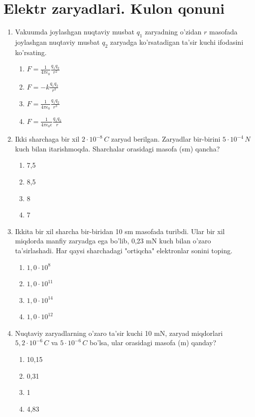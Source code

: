 \section{Elektr zaryadlari. Kulon qonuni}



\begin{enumerate}

\item Vakuumda joylashgan nuqtaviy musbat $q_1$ zaryadning o'zidan $r$ masofada joylashgan nuqtaviy musbat $q_2$ zaryadga ko'rsatadigan ta'sir kuchi ifodasini ko'rsating.
\begin{enumerate}[label=\Alph*)]
\item $F = \frac{1}{4\pi\epsilon_0} \frac{q_1 q_2}{r^2}$
\item $F = -k \frac{q_1 q_2}{r^3}$
\item $F = \frac{1}{4\pi\epsilon_0} \frac{q_1 q_2}{r^3}$
\item $F = \frac{1}{4\pi\epsilon_0 \epsilon} \frac{q_1 q_2}{r}$
\end{enumerate}

\item Ikki sharchaga bir xil $2 \cdot 10^{-8} \, C$ zaryad berilgan. Zaryadlar bir-birini $5 \cdot 10^{-4} \, N$ kuch bilan itarishmoqda. Sharchalar orasidagi masofa (sm) qancha?
\begin{enumerate}[label=\Alph*)]
\item 7,5
\item 8,5
\item 8
\item 7
\end{enumerate}

\item Ikkita bir xil sharcha bir-biridan 10 sm masofada turibdi. Ular bir xil miqdorda manfiy zaryadga ega bo'lib, 0,23 mN kuch bilan o'zaro ta'sirlashadi. Har qaysi sharchadagi "ortiqcha" elektronlar sonini toping.
\begin{enumerate}[label=\Alph*)]
\item $1,0 \cdot 10^8$
\item $1,0 \cdot 10^{11}$
\item $1,0 \cdot 10^{14}$
\item $1,0 \cdot 10^{12}$
\end{enumerate}

\item Nuqtaviy zaryadlarning o'zaro ta'sir kuchi 10 mN, zaryad miqdorlari $5,2 \cdot 10^{-6} \, C$ va $5 \cdot 10^{-6} \, C$ bo'lsa, ular orasidagi masofa (m) qanday?
\begin{enumerate}[label=\Alph*)]
\item 10,15
\item 0,31
\item 1
\item 4,83
\end{enumerate}


\end{enumerate}
